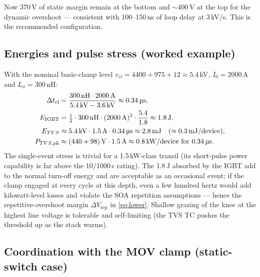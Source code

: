 \documentclass[11pt,a4paper]{article}
\begin{document}
Now 370\,V of static margin remain at the bottom and $\sim$400\,V at
the top for the dynamic overshoot --- consistent with 100--150\,ns of
loop delay at 3\,kV/\textmu s. This is the recommended configuration.

\subsection{Energies and pulse stress (worked example)}

With the nominal basic-clamp level
$v_{cl} = 4400 + 975 + 12 \approx 5.4$\,kV, $I_0=2000$\,A and
$L_\sigma=300$\,nH:
%
\begin{align}
  \Delta t_{\mathrm{cl}} &= \frac{300\,\mathrm{nH}\cdot 2000\,\mathrm{A}}
        {5.4\,\mathrm{kV}-3.6\,\mathrm{kV}} \approx 0.34\,\text{\textmu s},\\
  E_{\mathrm{IGBT}} &= \tfrac12\cdot300\,\mathrm{nH}\cdot(2000\,\mathrm{A})^2
        \cdot\frac{5.4}{1.8} \approx 1.8\,\mathrm{J},\\
  E_{TVS} &\approx 5.4\,\mathrm{kV}\cdot1.5\,\mathrm{A}\cdot0.34\,\text{\textmu s}
        \approx 2.8\,\mathrm{mJ}
        \quad(\approx0.3\,\mathrm{mJ/device}),\\
  P_{TVS,\mathrm{pk}} &\approx (440+98)\,\mathrm{V}\cdot1.5\,\mathrm{A}
        \approx 0.8\,\mathrm{kW/device\ for\ }0.34\,\text{\textmu s}.
\end{align}
%
The single-event stress is trivial for a 1.5\,kW-class transil (its
short-pulse power capability is far above the 10/1000\,\textmu s
rating). The 1.8\,J absorbed by the IGBT add to the normal turn-off
energy and are acceptable as an occasional event; if the clamp engaged
at every cycle at this depth, even a few hundred hertz would add
kilowatt-level losses and violate the SOA repetition assumptions ---
hence the repetitive-overshoot margin $\Delta V_{\mathrm{rep}}$ in
\eqref{eq:lower}. Shallow grazing of the knee at the highest line
voltage is tolerable and self-limiting (the TVS TC pushes the
threshold up as the stack warms).

\subsection{Coordination with the MOV clamp (static-switch case)}
\label{sec:mov}
\end{document}
